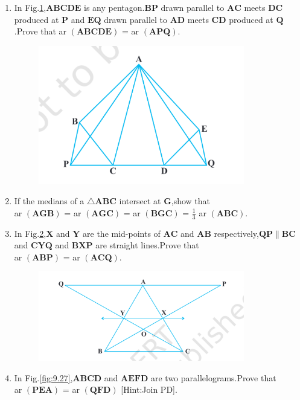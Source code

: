 \documentclass[12pt]{article}
\let\vec\mathbf
\begin{document}
\begin{enumerate}
\newpage
\item In Fig.\ref{fig:9.25},$\vec{ABCDE}$ is any pentagon.$\vec{BP}$ drawn parallel to $\vec{AC}$ meets $\vec{DC}$ produced at $\vec{P}$ and $\vec{EQ}$ drawn parallel to $\vec{AD}$ meets $\vec{CD}$ produced at $\vec{Q}$.Prove that ar $\vec{(ABCDE)}$ = ar $\vec{(APQ)}$.
\begin{figure}[h]
	\centering
	\includegraphics[width=9cm]{Figs/Fig9.25.png}
	\caption{}
	\label{fig:9.25}
\end{figure}
\item If the medians of a $ \triangle\vec{ABC} $ intersect at $\vec{G}$,show that  \\ ar $\vec{(AGB)}$ = ar $\vec{(AGC)}$ = ar $\vec{(BGC)}$ = $\frac{1}{3}$ ar $\vec{(ABC)}  $.
\item In Fig.\ref{fig:9.26},$\vec{X}$ and $\vec{Y}$ are the mid-points of $\vec{AC}$ and $\vec{AB}$ respectively,$\vec{QP} \parallel \vec{BC} $ and $\vec{CYQ}$ and $\vec{BXP}$ are straight lines.Prove that \\ ar $\vec{(ABP)}$ = ar $\vec{(ACQ)}$.
\begin{figure}[h]
	\centering
	\includegraphics[width=9cm]{Figs/Fig9.26.png}
	\caption{}
	\label{fig:9.26}
\end{figure}
\newpage
\item In Fig.\ref{fig:9.27},$\vec{ABCD}$ and $\vec{AEFD}$ are two parallelograms.Prove that \\ ar $\vec{(PEA)}$ = ar $\vec{(QFD)}$  [Hint:Join PD].
\begin{figure}[h]

\end{figure}
\end{enumerate}
\end{document}
